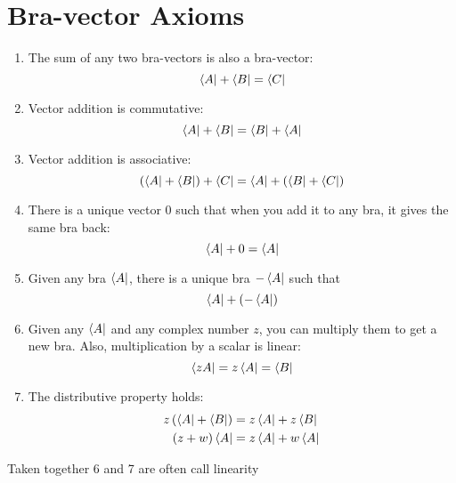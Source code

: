 \documentclass[12pt,a4paper,twocolumn]{article}
\begin{document}
\section{Bra-vector Axioms}
\begin{enumerate}
    \item The sum of any two bra-vectors is also a bra-vector:
    \begin{equation}
        \bra{A}  + \bra{B} = \bra{C}
    \end{equation}
    \item Vector addition is commutative:
    \begin{equation}
        \bra{ A } +\bra{ B } =\bra{B} +\bra{A}
    \end{equation}
    \item Vector addition is associative:
    \begin{equation}
        \left(\bra{ A } +\bra{ B }\right)+\bra{ C } =\bra{ A } +  \left(\bra{B }+\bra{ C }\right)
    \end{equation}
    \item There is a unique vector $0$ such that when you add it to any bra, it gives the same bra back:
    \begin{equation}
       \bra{ A } + 0 =\bra{ A }
    \end{equation}
    \item Given any bra $\bra{A}$, there is a unique bra $-\bra{A}$ such that
    \begin{equation}
       \bra{A} + \left( -\bra{A} \right)
    \end{equation}
    \item Given any $\bra{A}$ and any complex number $z$, you can multiply them to get a new bra. Also, multiplication by a scalar is linear:
    \begin{equation}
       \bra{zA} = z\bra{ A } =\bra{B}
    \end{equation}
    \item The distributive property holds:
    \begin{align}
        z\left(\bra{A} +\bra{B}\right) &=  z\bra{A} + z\bra{B}\\
        \left( z+w\right)\bra{A} &= z\bra{A} + w\bra{A}
    \end{align}
\end{enumerate}
Taken together 6 and 7 are often call linearity
\end{document}
